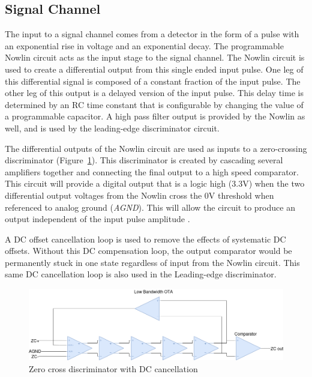\documentclass[12pt,oneside,final]{siuethesis}
\theoremstyle{definition}
\begin{document}
\subsection{Signal Channel}
\par The input to a signal channel comes from a detector in the form of a pulse with an exponential rise in voltage and an exponential decay. The programmable Nowlin circuit acts as the input stage to the signal channel. The Nowlin circuit is used to create a differential output from this single ended input pulse. One leg of this differential signal is composed of a constant fraction of the input pulse. The other leg of this output is a delayed version of the input pulse. This delay time is determined by an RC time constant that is configurable by changing the value of a programmable capacitor. A high pass filter output is provided by the Nowlin as well, and is used by the leading-edge discriminator circuit.
\par The differential outputs of the Nowlin circuit are used as inputs to a zero-crossing discriminator (Figure~\ref{fig:zcd}). This discriminator is created by cascading several amplifiers together and connecting the final output to a high speed comparator. This circuit will provide a digital output that is a logic high (3.3V) when the two differential output voltages from the Nowlin cross the 0V threshold when referenced to analog ground (\emph{AGND}). This will allow the circuit to produce an output independent of the input pulse amplitude \cite{CFD}. 
\par A DC offset cancellation loop is used to remove the effects of systematic DC offsets. Without this DC compensation loop, the output comparator would be permanently stuck in one state regardless of input from the Nowlin circuit. This same DC cancellation loop is also used in the Leading-edge discriminator.

\begin{figure}[htbp!]
\centering
\includegraphics[scale=.45,keepaspectratio=true]{./ch2_figures/zcd.png} 
\caption{Zero cross discriminator with DC cancellation}
\label{fig:zcd}
\end{figure}
\end{document}
